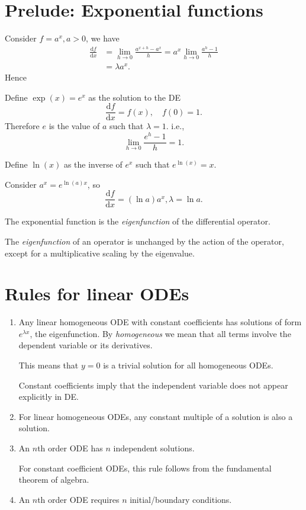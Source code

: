 \documentclass[10pt]{article}
\begin{document}
    \section{Prelude: Exponential functions}
    Consider $f=a^x, a>0$, we have
    \[
        \begin{aligned}
             \frac{\mathrm{d}f}{\mathrm{d}x} &= \lim_{h \to 0} \frac{a^{x+h}-a^x}{h}=a^x \lim_{h \to 0} \frac{a^h-1}{h}\\
            &= \lambda a^x.
        \end{aligned}
    \]
    Hence
    \begin{definition}
        Define $ \exp(x)=e^x $ as the solution to the DE 
        \[
            \frac{\mathrm{d}f}{\mathrm{d}x}=f(x), \quad f(0)=1 
        .\]
        Therefore $e$ is the value of $a$ such that $\lambda=1$. i.e.,
        \[
            \lim_{h \to 0} \frac{e^h-1}{h}=1
        .\]
    \end{definition}
    Define $ \ln (x) $ as the inverse of $e^x$ such that $ e^{\ln(x)}=x $.

    Consider $ a^x=e^{\ln(a)x}$, so 
    \[
        \frac{\mathrm{d}f}{\mathrm{d}x}=(\ln a)a^x, \lambda=\ln a 
    .\]

    The exponential function is the \textit{eigenfunction} of the differential operator.

    The \textit{eigenfunction} of an operator is unchanged by the action of the operator, except for a multiplicative scaling by the eigenvalue.
    \section{Rules for linear ODEs}
    \begin{enumerate}[\bfseries 1.]
        \item Any linear homogeneous ODE with constant coefficients has solutions of form $ e^{\lambda x} $, the eigenfunction. By \textit{homogeneous} we mean that all terms involve the dependent variable or its derivatives.

        This means that $y=0$ is a trivial solution for all homogeneous ODEs.

        Constant coefficients imply that the independent variable does not appear explicitly in DE.
        \item For linear homogeneous ODEs, any constant multiple of a solution is also a solution.
        \item An $n$th order ODE has $n$ independent solutions.

        For constant coefficient ODEs, this rule follows from the fundamental theorem of algebra.
        \item An $n$th order ODE requires $n$ initial/boundary conditions.
    \end{enumerate}
\end{document}
